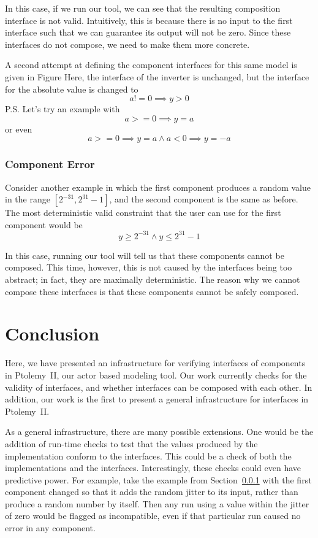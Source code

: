 \documentclass[preprint,11pt,authoryear]{sigplanconf}
\begin{document}
In this case, if we run our tool, we can see that the resulting composition interface is not valid.  Intuitively, this is because there is no input to the first interface such that we can guarantee its output will not be zero.  Since these interfaces do not compose, we need to make them more concrete.

A second attempt at defining the component interfaces for this same model is given in Figure%
Here, the interface of the inverter is unchanged, but the interface for the absolute value is changed to
\[
a != 0 \implies y > 0
\]
P.S. Let's try an example with \[ a >= 0 \implies y = a\] or even \[a >= 0 \implies y = a  \wedge a < 0 \implies y = -a\]

\subsubsection{Component Error} \label{sec:componentError}
Consider another example in which the first component produces a random value in the range $[2^{-31}, 2^{31}-1]$, and the second component is the same as before.
The most deterministic valid constraint that the user can use for the first component would be
\[
y \ge 2^{-31} \wedge y \le 2^{31}-1
\]

In this case, running our tool will tell us that these components cannot be composed.
This time, however, this is not caused by the interfaces being too abstract; in fact, they are maximally deterministic.
The reason why we cannot compose these interfaces is that these components cannot be safely composed.

\section{Conclusion}
Here, we have presented an infrastructure for verifying interfaces of components in Ptolemy~II, our actor based modeling tool.
Our work currently checks for the validity of interfaces, and whether interfaces can be composed with each other.
In addition, our work is the first to present a general infrastructure for interfaces in Ptolemy~II.

As a general infrastructure, there are many possible extensions.
One would be the addition of run-time checks to test that the values produced by the implementation conform to the interfaces.
This could be a check of both the implementations and the interfaces.
Interestingly, these checks could even have predictive power.
For example, take the example from Section~\ref{sec:componentError} with the first component changed so that it adds the random jitter to its input, rather than produce a random number by itself.
Then any run using a value within the jitter of zero would be flagged as incompatible, even if that particular run caused no error in any component.
\end{document}
